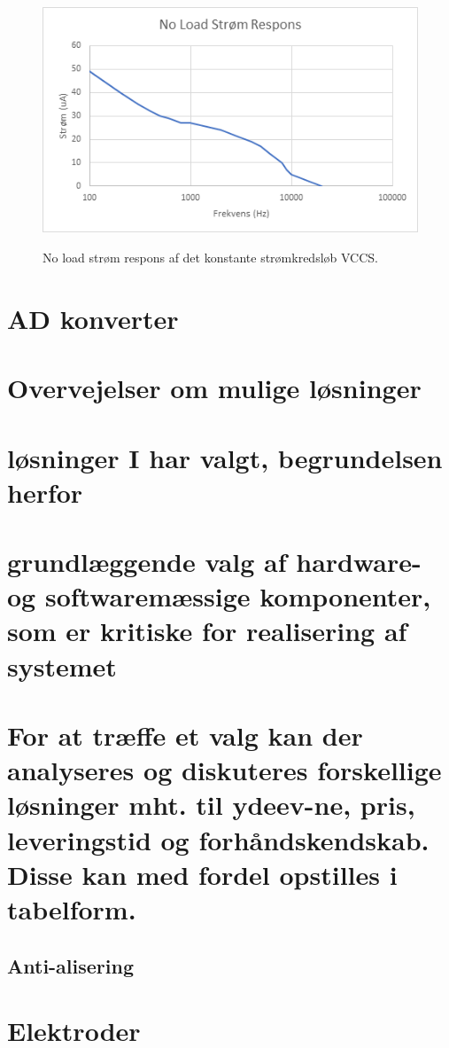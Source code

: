 \documentclass[main.tex]{subfiles}
\begin{document}
\begin{figure}[H]
\centering
{\includegraphics[width=12cm]
{Figure/stromfrekvensoprindelig}}
\caption{No load strøm respons af det konstante strømkredsløb VCCS. }
\label{stromfrekvens}
\end{figure}



\section{AD konverter}
\section{Overvejelser om mulige løsninger}
\section{løsninger I har valgt, begrundelsen herfor}
\section{grundlæggende valg af hardware- og softwaremæssige komponenter, som er kritiske for realisering af systemet}

\section{For at træffe et valg kan der analyseres og diskuteres forskellige løsninger mht. til ydeev-ne, pris, leveringstid og forhåndskendskab. Disse kan med fordel opstilles i tabelform.}

\subsection{Anti-alisering}
\section{Elektroder}
\end{document}
